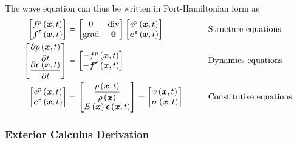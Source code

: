 The wave equation can thus be written in Port-Hamiltonian form as
\begin{equation}
  \begin{aligned}
    \begin{bmatrix}
       f^{p}\left(  \boldsymbol{x} ,t \right)  \\
        \boldsymbol{f} ^{ \boldsymbol{\epsilon} }\left(  \boldsymbol{x} ,t \right) 
    \end{bmatrix}&=\begin{bmatrix}
    0 & \operatorname{div} \\
    \operatorname{grad} &  \boldsymbol{0} 
    \end{bmatrix}\begin{bmatrix}
       e^{p}\left(  \boldsymbol{x} ,t \right)  \\
        \boldsymbol{e} ^{ \boldsymbol{\epsilon} }\left(  \boldsymbol{x} ,t \right) 
    \end{bmatrix}&\qquad&\text{Structure equations}\\
    \begin{bmatrix}
       \dfrac{\partial  p\left(  \boldsymbol{x} ,t \right) }{\partial t}  \\
       \dfrac{\partial   \boldsymbol{\epsilon} \left(  \boldsymbol{x} ,t \right) }{\partial t}       
    \end{bmatrix}&=\begin{bmatrix}
      - f^{p}\left(  \boldsymbol{x} ,{t} \right)  \\
      -  \boldsymbol{f} ^{ \boldsymbol{\epsilon} }\left(  \boldsymbol{x} ,{t} \right)  \\          
    \end{bmatrix}&\qquad&\text{Dynamics equations}\\
    \begin{bmatrix}
       e^{p}\left(  \boldsymbol{x} ,t \right) \\
        \boldsymbol{e} ^{ \boldsymbol{\epsilon} }\left(  \boldsymbol{x} ,t \right) \\
    \end{bmatrix}&=\begin{bmatrix}
    \dfrac{ p\left(  \boldsymbol{x} ,t \right) }{ \rho\left(  \boldsymbol{x}  \right) }\\
     E\left(  \boldsymbol{x}  \right)   \boldsymbol{\epsilon} \left(  \boldsymbol{x} ,t \right) 
    \end{bmatrix}=\begin{bmatrix}
     v\left(  \boldsymbol{x} ,t \right) \\
     \boldsymbol{\mathit{\sigma}}\left(  \boldsymbol{x} ,t \right) 
    \end{bmatrix}&\qquad&\text{Constitutive equations}
  \end{aligned}
\end{equation}


\subsubsection{Exterior Calculus Derivation}

